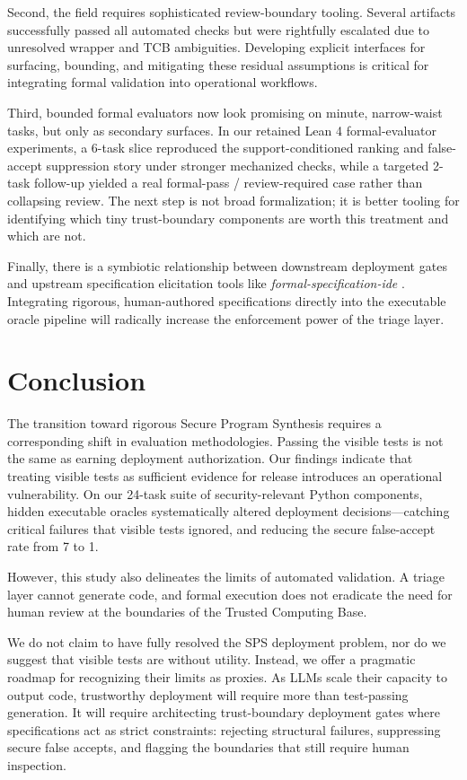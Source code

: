 \documentclass[11pt]{article}
\begin{document}
Second, the field requires sophisticated review-boundary tooling. Several artifacts successfully passed all automated checks but were rightfully escalated due to unresolved wrapper and TCB ambiguities. Developing explicit interfaces for surfacing, bounding, and mitigating these residual assumptions is critical for integrating formal validation into operational workflows.

Third, bounded formal evaluators now look promising on minute, narrow-waist tasks, but only as secondary surfaces. In our retained Lean 4 formal-evaluator experiments, a 6-task slice reproduced the support-conditioned ranking and false-accept suppression story under stronger mechanized checks, while a targeted 2-task follow-up yielded a real formal-pass / review-required case rather than collapsing review. The next step is not broad formalization; it is better tooling for identifying which tiny trust-boundary components are worth this treatment and which are not.

Finally, there is a symbiotic relationship between downstream deployment gates and upstream specification elicitation tools like \textit{formal-specification-ide} \cite{Atlas2026SpecIDE}. Integrating rigorous, human-authored specifications directly into the executable oracle pipeline will radically increase the enforcement power of the triage layer.

\section{Conclusion}

The transition toward rigorous Secure Program Synthesis requires a corresponding shift in evaluation methodologies. Passing the visible tests is not the same as earning deployment authorization. Our findings indicate that treating visible tests as sufficient evidence for release introduces an operational vulnerability. On our 24-task suite of security-relevant Python components, hidden executable oracles systematically altered deployment decisions---catching critical failures that visible tests ignored, and reducing the secure false-accept rate from 7 to 1.

However, this study also delineates the limits of automated validation. A triage layer cannot generate code, and formal execution does not eradicate the need for human review at the boundaries of the Trusted Computing Base.

We do not claim to have fully resolved the SPS deployment problem, nor do we suggest that visible tests are without utility. Instead, we offer a pragmatic roadmap for recognizing their limits as proxies. As LLMs scale their capacity to output code, trustworthy deployment will require more than test-passing generation. It will require architecting trust-boundary deployment gates where specifications act as strict constraints: rejecting structural failures, suppressing secure false accepts, and flagging the boundaries that still require human inspection.
\end{document}
